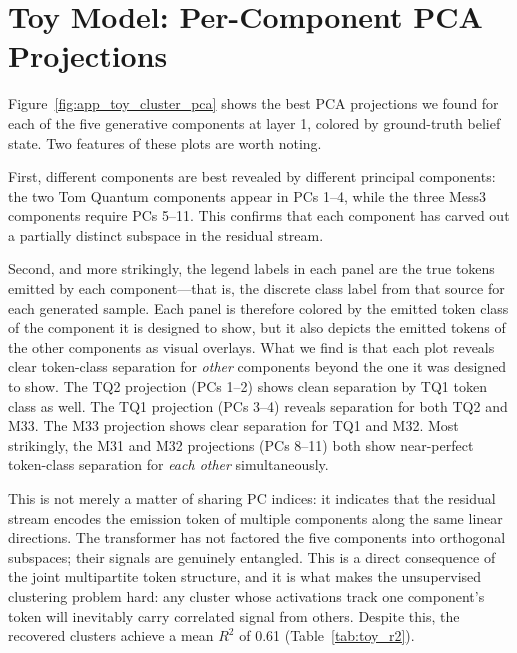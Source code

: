 \documentclass{article}
\begin{document}
\section{Toy Model: Per-Component PCA Projections}
\label{app:toy_pca_clusters}

Figure~\ref{fig:app_toy_cluster_pca} shows the best PCA projections we found for
each of the five generative components at layer 1, colored by ground-truth belief
state.  Two features of these plots are worth noting.

First, different components are best revealed by different principal components: the
two Tom Quantum components appear in PCs 1--4, while the three Mess3 components
require PCs 5--11.  This confirms that each component has carved out a partially
distinct subspace in the residual stream.

Second, and more strikingly, the legend labels in each panel are the true tokens
emitted by each component---that is, the discrete class label from that source
for each generated sample.  Each panel is therefore colored by the emitted token
class of the component it is designed to show, but it also depicts the emitted
tokens of the other components as visual overlays.  What we find is that each plot
reveals clear token-class separation for \emph{other} components beyond the one it
was designed to show.  The TQ2 projection (PCs 1--2) shows clean separation by TQ1
token class as well.  The TQ1 projection (PCs 3--4) reveals separation for both TQ2
and M33.  The M33 projection shows clear separation for TQ1 and M32.  Most
strikingly, the M31 and M32 projections (PCs 8--11) both show near-perfect
token-class separation for \emph{each other} simultaneously.

This is not merely a matter of sharing PC indices: it indicates that the residual
stream encodes the emission token of multiple components along the same linear
directions.  The transformer has not factored the five components into orthogonal
subspaces; their signals are genuinely entangled.  This is a direct consequence of
the joint multipartite token structure, and it is what makes the unsupervised
clustering problem hard: any cluster whose activations track one component's token
will inevitably carry correlated signal from others.  Despite this, the recovered
clusters achieve a mean $R^2$ of 0.61 (Table~\ref{tab:toy_r2}).
\end{document}
